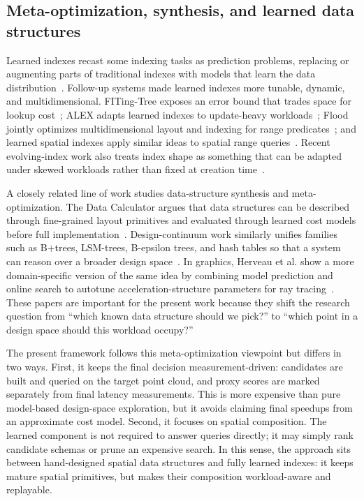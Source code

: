 \subsection{Meta-optimization, synthesis, and learned data structures}

Learned indexes recast some indexing tasks as prediction problems, replacing or augmenting parts of traditional indexes with models that learn the data distribution~\cite{kraska2018learned}. Follow-up systems made learned indexes more tunable, dynamic, and multidimensional. FITing-Tree exposes an error bound that trades space for lookup cost~\cite{galakatos2019fitingtree}; ALEX adapts learned indexes to update-heavy workloads~\cite{ding2020alex}; Flood jointly optimizes multidimensional layout and indexing for range predicates~\cite{nathan2020flood}; and learned spatial indexes apply similar ideas to spatial range queries~\cite{pandey2020learnedspatial}. Recent evolving-index work also treats index shape as something that can be adapted under skewed workloads rather than fixed at creation time~\cite{wang2025shapeshifter}.

A closely related line of work studies data-structure synthesis and meta-optimization. The Data Calculator argues that data structures can be described through fine-grained layout primitives and evaluated through learned cost models before full implementation~\cite{idreos2018datacalculator}. Design-continuum work similarly unifies families such as B+trees, LSM-trees, B-epsilon trees, and hash tables so that a system can reason over a broader design space~\cite{idreos2019learningkv}. In graphics, Herveau et al. show a more domain-specific version of the same idea by combining model prediction and online search to autotune acceleration-structure parameters for ray tracing~\cite{herveau2023autotuning}. These papers are important for the present work because they shift the research question from ``which known data structure should we pick?'' to ``which point in a design space should this workload occupy?''

The present framework follows this meta-optimization viewpoint but differs in two ways. First, it keeps the final decision measurement-driven: candidates are built and queried on the target point cloud, and proxy scores are marked separately from final latency measurements. This is more expensive than pure model-based design-space exploration, but it avoids claiming final speedups from an approximate cost model. Second, it focuses on spatial composition. The learned component is not required to answer queries directly; it may simply rank candidate schemas or prune an expensive search. In this sense, the approach sits between hand-designed spatial data structures and fully learned indexes: it keeps mature spatial primitives, but makes their composition workload-aware and replayable.
